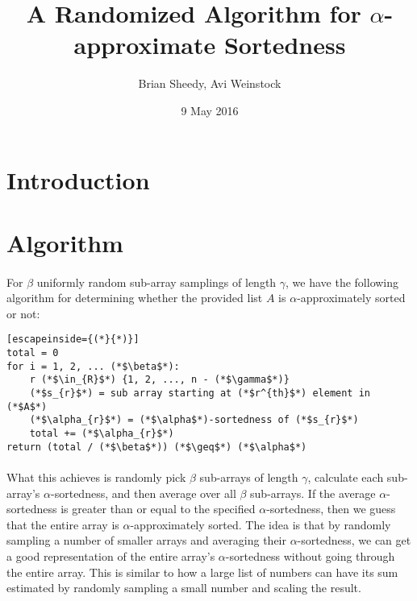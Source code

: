 \documentclass{article}
\title{A Randomized Algorithm for $\alpha$-approximate Sortedness}
\date{9 May 2016}
\author{Brian Sheedy, Avi Weinstock}
\begin{document}
\maketitle{}
\section{Introduction}
\section{Algorithm}
\paragraph{}For $\beta$ uniformly random sub-array samplings of length $\gamma$, we have the following algorithm for determining whether the provided list $A$ is $\alpha$-approximately sorted or not:
\begin{lstlisting}[escapeinside={(*}{*)}]
total = 0
for i = 1, 2, ... (*$\beta$*):
    r (*$\in_{R}$*) {1, 2, ..., n - (*$\gamma$*)}
    (*$s_{r}$*) = sub array starting at (*$r^{th}$*) element in (*$A$*)
    (*$\alpha_{r}$*) = (*$\alpha$*)-sortedness of (*$s_{r}$*)
    total += (*$\alpha_{r}$*)
return (total / (*$\beta$*)) (*$\geq$*) (*$\alpha$*)
\end{lstlisting}
\paragraph{}What this achieves is randomly pick $\beta$ sub-arrays of length $\gamma$, calculate each sub-array's $\alpha$-sortedness, and then average over all $\beta$ sub-arrays.
 If the average $\alpha$-sortedness is greater than or equal to the specified $\alpha$-sortedness, then we guess that the entire array is $\alpha$-approximately sorted.
The idea is that by randomly sampling a number of smaller arrays and averaging their $\alpha$-sortedness, we can get a good representation of the entire array's $\alpha$-sortedness without going through the entire array.
 This is similar to how a large list of numbers can have its sum estimated by randomly sampling a small number and scaling the result.
\end{document}

